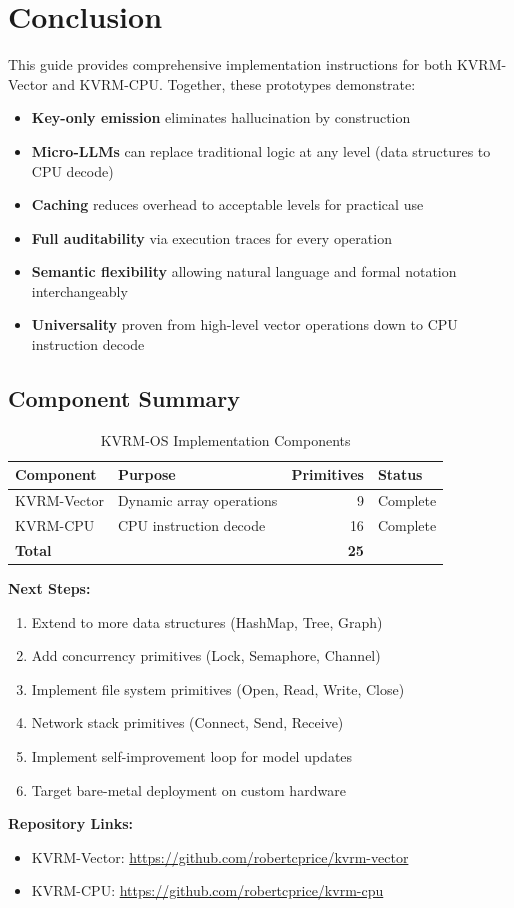 \documentclass[11pt,a4paper]{article}
\begin{document}
\section{Conclusion}

This guide provides comprehensive implementation instructions for both KVRM-Vector and KVRM-CPU. Together, these prototypes demonstrate:

\begin{itemize}
    \item \textbf{Key-only emission} eliminates hallucination by construction
    \item \textbf{Micro-LLMs} can replace traditional logic at any level (data structures to CPU decode)
    \item \textbf{Caching} reduces overhead to acceptable levels for practical use
    \item \textbf{Full auditability} via execution traces for every operation
    \item \textbf{Semantic flexibility} allowing natural language and formal notation interchangeably
    \item \textbf{Universality} proven from high-level vector operations down to CPU instruction decode
\end{itemize}

\subsection{Component Summary}

\begin{table}[h]
\centering
\begin{tabular}{llrl}
\toprule
\textbf{Component} & \textbf{Purpose} & \textbf{Primitives} & \textbf{Status} \\
\midrule
KVRM-Vector & Dynamic array operations & 9 & Complete \\
KVRM-CPU & CPU instruction decode & 16 & Complete \\
\midrule
\textbf{Total} & & \textbf{25} & \\
\bottomrule
\end{tabular}
\caption{KVRM-OS Implementation Components}
\end{table}

\textbf{Next Steps:}
\begin{enumerate}
    \item Extend to more data structures (HashMap, Tree, Graph)
    \item Add concurrency primitives (Lock, Semaphore, Channel)
    \item Implement file system primitives (Open, Read, Write, Close)
    \item Network stack primitives (Connect, Send, Receive)
    \item Implement self-improvement loop for model updates
    \item Target bare-metal deployment on custom hardware
\end{enumerate}

\textbf{Repository Links:}
\begin{itemize}
    \item KVRM-Vector: \url{https://github.com/robertcprice/kvrm-vector}
    \item KVRM-CPU: \url{https://github.com/robertcprice/kvrm-cpu}
\end{itemize}
\end{document}
